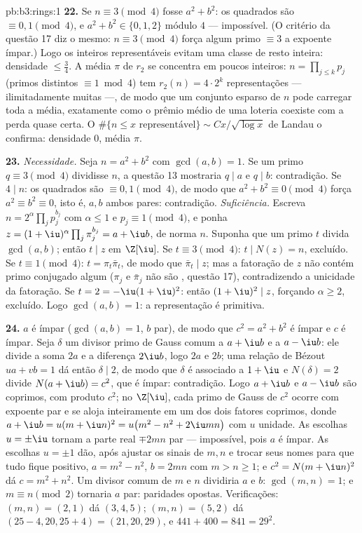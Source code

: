 \begin{solution}{pb:b3:rings:1}
\textbf{22.} Se $n \equiv 3 \pmod4$ fosse $a^2 + b^2$: os quadrados são $\equiv 0, 1 \pmod 4$, e $a^2 + b^2 \in \{0, 1, 2\}$ módulo
$4$ --- impossível. (O critério da questão 17 diz o mesmo: $n \equiv 3 \pmod 4$
força algum primo $\equiv 3$ a expoente ímpar.) Logo os inteiros
representáveis evitam uma classe de resto inteira: densidade $\leq \frac34$. A
média $\pi$ de $r_2$ se concentra em poucos inteiros: $n = \prod_{j\leq k}p_j$
(primos distintos $\equiv 1 \bmod 4$) tem $r_2(n) = 4\cdot2^k$ representações --- ilimitadamente
muitas ---, de modo que um conjunto esparso de $n$ pode carregar toda
a média, exatamente como o prêmio médio de uma loteria coexiste com a
perda quase certa. O $\#\{n \leq x \text{ representável}\} \sim
Cx/\sqrt{\log x}$ de Landau o confirma: densidade $0$, média
$\pi$.

\textbf{23.} \emph{Necessidade.} Seja $n = a^2 + b^2$ com $\gcd(a, b) = 1$. Se um primo $q \equiv 3 \pmod 4$
dividisse $n$, a questão 13 mostraria $q \mid a$ e $q \mid b$: contradição. Se
$4 \mid n$: os quadrados são $\equiv 0, 1 \pmod 4$, de modo que $a^2 + b^2
\equiv 0 \pmod 4$ força $a^2 \equiv b^2 \equiv 0$, isto é,
$a,
b$ ambos pares: contradição. \emph{Suficiência.} Escreva $n =
2^{\alpha}\prod_jp_j^{b_j}$
com $\alpha \leq 1$ e $p_j
\equiv 1 \pmod 4$, e ponha $z = (1+\iu)^{\alpha}\prod_j
\pi_j^{b_j} = a + \iu b$, de norma $n$. Suponha que um primo
$t$ divida $\gcd(a, b)$; então $t \mid z$ em $\Z[\iu]$. Se $t
\equiv 3 \pmod 4$: $t \mid N(z) = n$, excluído. Se
$t \equiv 1
\pmod 4$: $t = \pi_t\bar\pi_t$, de modo que $\bar\pi_t \mid z$; mas a fatoração de $z$ não contém
primo conjugado algum ($\pi_j$ e $\bar\pi_j$ não são , questão
17), contradizendo a unicidade da fatoração. Se $t = 2 = -\iu(1+\iu)^2$: então $(1+\iu)^2 \mid z$,
forçando $\alpha \geq 2$, excluído. Logo $\gcd(a, b) = 1$: a representação é primitiva.

\textbf{24.} $a$ é ímpar ($\gcd(a, b) = 1$, $b$ par), de modo que $c^2
= a^2 + b^2$ é
ímpar e $c$ é ímpar. Seja $\delta$ um divisor primo de Gauss
comum a $a + \iu b$ e a $a - \iu b$: ele divide a soma $2a$ e a diferença
$2\iu b$, logo $2a$ e $2b$; uma relação de Bézout $ua + vb = 1$ dá
então $\delta \mid 2$, de modo que $\delta$ é associado a $1 + \iu$ e $N(\delta) = 2$ divide
$N(a + \iu b) = c^2$, que é ímpar: contradição. Logo $a + \iu b$ e $a - \iu b$ são coprimos, com
produto $c^2$; no  $\Z[\iu]$, cada primo de Gauss de $c^2$ ocorre
com expoente par e se aloja inteiramente em um dos dois fatores
coprimos, donde $a + \iu b = u(m + \iu
n)^2 = u\bigl(m^2 - n^2 + 2\iu mn\bigr)$ com $u$ unidade. As escolhas $u = \pm\iu$ tornam a
parte real $\mp 2mn$ par --- impossível, pois $a$ é ímpar. As escolhas
$u = \pm1$ dão, após ajustar os sinais de $m, n$ e trocar seus nomes para
que tudo fique positivo, $a = m^2 - n^2$, $b = 2mn$ com $m > n
\geq 1$; e $c^2 = N(m + \iu n)^2$ dá $c = m^2 + n^2$. Um
divisor comum de $m$ e $n$ dividiria $a$ e $b$: $\gcd
(m, n) = 1$; e
$m \equiv n \pmod 2$ tornaria $a$ par: paridades opostas. Verificações: $(m, n) = (2, 1)$ dá
$(3, 4,
5)$; $(m, n) = (5, 2)$ dá $(25 - 4, 20, 25 + 4) = (21, 20,
29)$, e $441 + 400 = 841 = 29^2$.


\end{solution}
